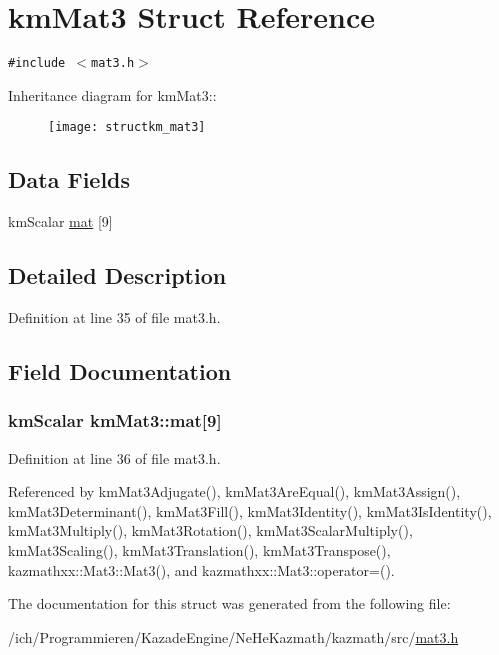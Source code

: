\hypertarget{structkm_mat3}{
\section{kmMat3 Struct Reference}
\label{structkm_mat3}
}
{\tt \#include $<$mat3.h$>$}

Inheritance diagram for kmMat3::\begin{figure}[H]
\begin{center}
\leavevmode
\texttt{[image: structkm\_mat3]}
\end{center}
\end{figure}
\subsection*{Data Fields}
\begin{CompactItemize}
\item 
kmScalar \hyperlink{structkm_mat3_e62896cf1c8f7a94e7a18dede8480125}{mat} \mbox{[}9\mbox{]}
\end{CompactItemize}


\subsection{Detailed Description}


Definition at line 35 of file mat3.h.

\subsection{Field Documentation}
\hypertarget{structkm_mat3_e62896cf1c8f7a94e7a18dede8480125}{
\subsubsection[mat]{\setlength{\rightskip}{0pt plus 5cm}kmScalar {\bf kmMat3::mat}\mbox{[}9\mbox{]}}}
\label{structkm_mat3_e62896cf1c8f7a94e7a18dede8480125}




Definition at line 36 of file mat3.h.

Referenced by kmMat3Adjugate(), kmMat3AreEqual(), kmMat3Assign(), kmMat3Determinant(), kmMat3Fill(), kmMat3Identity(), kmMat3IsIdentity(), kmMat3Multiply(), kmMat3Rotation(), kmMat3ScalarMultiply(), kmMat3Scaling(), kmMat3Translation(), kmMat3Transpose(), kazmathxx::Mat3::Mat3(), and kazmathxx::Mat3::operator=().

The documentation for this struct was generated from the following file:\begin{CompactItemize}
\item 
/ich/Programmieren/KazadeEngine/NeHeKazmath/kazmath/src/\hyperlink{mat3_8h}{mat3.h}\end{CompactItemize}
